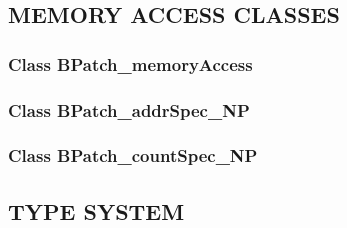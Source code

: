 \subsection{MEMORY ACCESS CLASSES}
\subsubsection{Class BPatch\_memoryAccess}
\subsubsection{Class BPatch\_addrSpec\_NP}
\subsubsection{Class BPatch\_countSpec\_NP}
\subsection{TYPE SYSTEM}\label{sec:type_system}

\pagebreak
